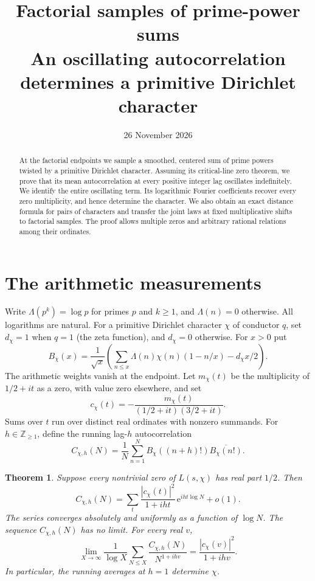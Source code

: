 \documentclass[11pt]{article}
\title{Factorial samples of prime-power sums\\[2pt]\large An oscillating autocorrelation determines a primitive Dirichlet character}
\author{}
\date{26 November 2026}
\newtheorem{theorem}{Theorem}
\newcommand{\e}{\mathrm e}
\begin{document}
\maketitle\thispagestyle{plain}
\begin{abstract}
At the factorial endpoints we sample a smoothed, centered sum of prime
powers twisted by a primitive Dirichlet character. Assuming its
critical-line zero theorem, we prove that its mean autocorrelation at
every positive integer lag oscillates indefinitely. We identify the
entire oscillating term. Its logarithmic Fourier coefficients recover
every zero multiplicity, and hence determine the character. We also
obtain an exact distance formula for pairs of characters and transfer
the joint laws at fixed multiplicative shifts to factorial samples.
The proof allows multiple zeros and arbitrary rational relations among
their ordinates.
\end{abstract}

\section{The arithmetic measurements}
Write $\Lambda(p^k)=\log p$ for primes $p$ and $k\ge1$, and
$\Lambda(n)=0$ otherwise. All logarithms are natural. For a primitive
Dirichlet character $\chi$ of conductor $q$, set $d_\chi=1$ when $q=1$
(the zeta function), and $d_\chi=0$ otherwise. For $x>0$ put
\begin{equation}\label{eq:B}
 B_\chi(x)=\frac{1}{\sqrt x}
 \left(\sum_{n\le x}\Lambda(n)\chi(n)(1-n/x)-d_\chi x/2\right).
\end{equation}
The arithmetic weights vanish at the endpoint. Let
$m_\chi(t)$ be the multiplicity of $1/2+it$ as a zero, with value
zero elsewhere, and set
\[
 c_\chi(t)=-\frac{m_\chi(t)}{(1/2+it)(3/2+it)}.
\]
Sums over $t$ run over distinct real ordinates with nonzero summands.
For $h\in\mathbb Z_{\ge1}$, define the running lag-$h$ autocorrelation
\[
 C_{\chi,h}(N)=\frac1N\sum_{n=1}^{N}B_\chi((n+h)!)\overline{B_\chi(n!)}.
\]

\begin{theorem}\label{th:lag}
Suppose every nontrivial zero of $L(s,\chi)$ has real part $1/2$. Then
\begin{equation}\label{eq:lag}
 C_{\chi,h}(N)=
 \sum_t\frac{|c_\chi(t)|^2}{1+iht}\,\e^{iht\log N}+o(1).
\end{equation}
The series converges absolutely and uniformly as a function of $\log N$.
The sequence $C_{\chi,h}(N)$ has no limit. For every real $v$,
\begin{equation}\label{eq:outer}
 \lim_{X\to\infty}\frac{1}{\log X}\sum_{N\le X}
 \frac{C_{\chi,h}(N)}{N^{1+ihv}}
 =\frac{|c_\chi(v)|^2}{1+ihv}.
\end{equation}
In particular, the running averages at $h=1$ determine $\chi$.
\end{theorem}
\end{document}
